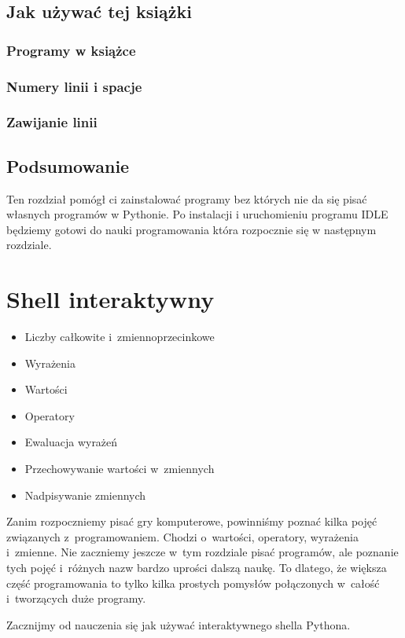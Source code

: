 \documentclass{book}
\newcommand{\btopicscovered}{
	\begin{graybox}
	\begin{itemize}
}
\newcommand{\etopicscovered}{
	\end{itemize}
	\end{graybox}
}
\begin{document}
\section{Jak używać tej książki}

\subsection{Programy w książce}
\subsection{Numery linii i spacje}
\subsection{Zawijanie linii}
\section{Podsumowanie}

Ten rozdział pomógł ci zainstalować programy bez których nie da się pisać własnych programów w Pythonie. Po instalacji i uruchomieniu programu IDLE będziemy gotowi do nauki programowania która rozpocznie się w następnym rozdziale.


\chapter{Shell interaktywny}
\btopicscovered
	\item Liczby całkowite i~zmiennoprzecinkowe
	\item Wyrażenia
	\item Wartości
	\item Operatory
	\item Ewaluacja wyrażeń
	\item Przechowywanie wartości w~zmiennych
	\item Nadpisywanie zmiennych
\etopicscovered

Zanim rozpoczniemy pisać gry komputerowe, powinniśmy poznać kilka pojęć związanych z~programowaniem. Chodzi o~wartości, operatory, wyrażenia i~zmienne. Nie zaczniemy jeszcze w~tym rozdziale pisać programów, ale poznanie tych pojęć i~różnych nazw bardzo uprości dalszą naukę. To dlatego, że większa część programowania to tylko kilka prostych pomysłów połączonych w~całość i~tworzących duże programy.

Zacznijmy od nauczenia się jak używać interaktywnego shella Pythona.
\end{document}
